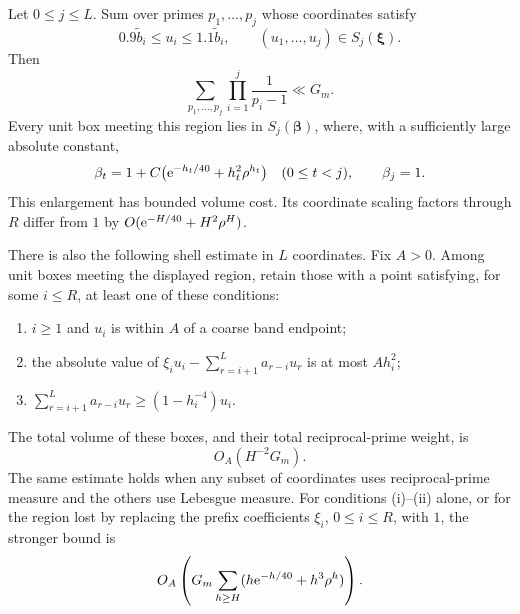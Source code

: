 \begin{lemma}\label{lem:boxes}
Let \(0\le j\le L\).  Sum over primes \(p_1,\ldots,p_j\) whose
coordinates satisfy
\[
 0.9\widetilde b_i\le u_i\le1.1\widetilde b_i,\qquad
 (u_1,\ldots,u_j)\in S_j(\boldsymbol\xi).
\]
Then
\begin{equation}\label{eq:projected-mass}
 \sum_{p_1,\ldots,p_j}\prod_{i=1}^j\frac1{p_i-1}\ll G_m.
\end{equation}
Every unit box meeting this region lies in
\(S_j(\boldsymbol\beta)\), where, with a sufficiently large absolute
constant,
\begin{equation}\label{eq:box-enlargement}
 \beta_t=1+C\bigl(\mathrm e^{-h_t/40}+h_t^2\rho^{h_t}\bigr)
 \quad(0\le t<j),\qquad \beta_j=1.
\end{equation}
This enlargement has bounded volume cost.  Its coordinate scaling
factors through \(R\) differ from \(1\) by
\(O(\mathrm e^{-H/40}+H^2\rho^H)\).

There is also the following shell estimate in \(L\) coordinates.
Fix \(A>0\).  Among unit boxes meeting the displayed region, retain
those with a point satisfying, for some \(i\le R\), at least one of
these conditions:
\begin{enumerate}[label=(\roman*)]
\item \(i\ge1\) and \(u_i\) is within \(A\) of a coarse band endpoint;
\item the absolute value of
\(\xi_i u_i-\sum_{r=i+1}^L a_{r-i}u_r\) is at most \(Ah_i^2\);
\item \(\sum_{r=i+1}^L a_{r-i}u_r\ge(1-h_i^{-4})u_i\).
\end{enumerate}
The total volume of these boxes, and their total reciprocal-prime
weight, is
\begin{equation}\label{eq:boundary-mass}
 O_A(H^{-2}G_m).
\end{equation}
The same estimate holds when any subset of coordinates uses
reciprocal-prime measure and the others use Lebesgue measure.
For conditions (i)--(ii) alone, or for the region lost by replacing
the prefix coefficients \(\xi_i\), \(0\le i\le R\), with \(1\),
the stronger bound is
\[
 O_A\left(G_m\sum_{h\ge H}
       (h\mathrm e^{-h/40}+h^3\rho^h)\right).
\]
\end{lemma}


